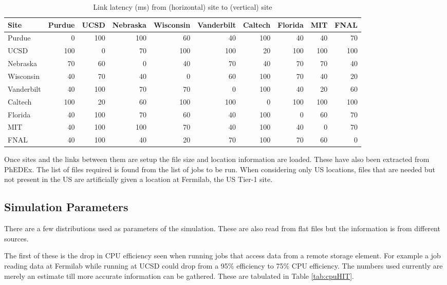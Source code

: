 \documentclass[a4paper]{jpconf}
\begin{document}
\begin{table}
  \begin{center}
    \begin{footnotesize}
      \begin{tabular}{|l|rrrrrrrrr|}
        \hline
        Site & Purdue & UCSD & Nebraska & Wisconsin & Vanderbilt & Caltech & Florida & MIT & FNAL \\
        \hline
        Purdue & 0 & 100 & 100 & 60 & 40 & 100 & 40 & 40 & 70 \\
        UCSD & 100 & 0 & 70 & 100 & 100 & 20 & 100 & 100 & 100 \\
        Nebraska & 70 & 60 & 0 & 40 & 70 & 40 & 70 & 70 & 40 \\
        Wisconsin & 40 & 70 & 40 & 0 & 60 & 100 & 70 & 40 & 20 \\
        Vanderbilt & 40 & 100 & 70 & 70 & 0 & 100 & 40 & 20 & 60 \\
        Caltech & 100 & 20 & 60 & 100 & 100 & 0 & 100 & 100 & 100 \\
        Florida & 40 & 100 & 70 & 60 & 40 & 100 & 0 & 60 & 70 \\
        MIT & 40 & 100 & 100 & 70 & 40 & 100 & 40 & 0 & 70 \\
        FNAL & 40 & 100 & 40 & 20 & 70 & 100 & 70 & 60 & 0 \\
        \hline
      \end{tabular}
      \caption{Link latency (ms) from (horizontal) site to (vertical) site\label{tab:latency}}
    \end{footnotesize}
  \end{center}
\end{table}

Once sites and the links between them are setup the file size and
location information are loaded. These have also been extracted from
PhEDEx. The list of files required is found from the list of jobs to
be run. When considering only US locations, files that are needed but
not present in the US are artificially given a location at Fermilab,
the US Tier-1 site.

\subsection{Simulation Parameters}

There are a few distributions used as parameters of the
simulation. These are also read from flat files but the information is
from different sources.

The first of these is the drop in CPU efficiency seen when running
jobs that access data from a remote storage element. For example a job
reading data at Fermilab while running at UCSD could drop from a 95\%
efficiency to 75\% CPU efficiency. The numbers used currently are
merely an estimate till more accurate information can be
gathered. These are tabulated in Table \ref{tab:cpuHIT}.
\end{document}
